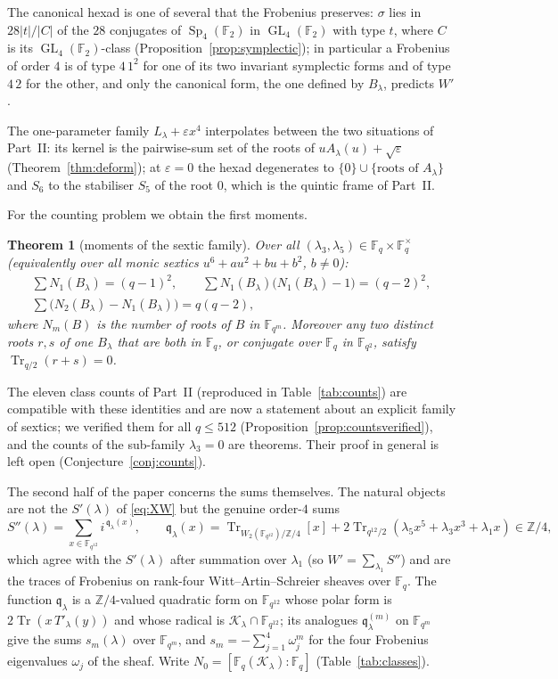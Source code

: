 ﻿\documentclass[12pt,a4paper]{amsart}
\newtheorem{theorem}{Theorem}[section]
\theoremstyle{definition}
\newcommand{\F}{\mathbb{F}}
\newcommand{\Z}{\mathbb{Z}}
\newcommand{\Tr}{\operatorname{Tr}}
\newcommand{\Sp}{\operatorname{Sp}}
\newcommand{\GL}{\operatorname{GL}}
\newcommand{\eps}{\varepsilon}
\newcommand{\Kk}{\mathcal{K}}
\newcommand{\qq}{\mathfrak{q}}
\newcommand{\Spp}{S''}
\begin{document}
The canonical hexad is one of several that the Frobenius preserves: $\sigma$ lies in $28|t|/|C|$ of the $28$ conjugates of $\Sp_4(\F_2)$ in $\GL_4(\F_2)$ with type $t$, where $C$ is its $\GL_4(\F_2)$-class (Proposition~\ref{prop:symplectic}); in particular a Frobenius of order $4$ is of type $4\,1^2$ for one of its two invariant symplectic forms and of type $4\,2$ for the other, and only the canonical form, the one defined by $B_\lambda$, predicts $W'$.

The one-parameter family $L_\lambda+\eps x^4$ interpolates between the two situations of Part~II: its kernel is the pairwise-sum set of the roots of $uA_\lambda(u)+\sqrt\eps$ (Theorem~\ref{thm:deform}); at $\eps=0$ the hexad degenerates to $\{0\}\cup\{\text{roots of }A_\lambda\}$ and $S_6$ to the stabiliser $S_5$ of the root $0$, which is the quintic frame of Part~II.

For the counting problem we obtain the first moments.

\begin{theorem}[moments of the sextic family]\label{thm:moments}
Over all $(\lambda_3,\lambda_5)\in\F_q\times\F_q^\times$ (equivalently over all monic sextics $u^6+au^2+bu+b^2$, $b\ne0$):
\begin{gather*}
\sum N_1(B_\lambda)=(q-1)^2,\qquad \sum N_1(B_\lambda)\bigl(N_1(B_\lambda)-1\bigr)=(q-2)^2,\\
\sum\bigl(N_2(B_\lambda)-N_1(B_\lambda)\bigr)=q(q-2),
\end{gather*}
where $N_m(B)$ is the number of roots of $B$ in $\F_{q^m}$. Moreover any two distinct roots $r,s$ of one $B_\lambda$ that are both in $\F_q$, or conjugate over $\F_q$ in $\F_{q^2}$, satisfy $\Tr_{q/2}(r+s)=0$.
\end{theorem}

The eleven class counts of Part~II (reproduced in Table~\ref{tab:counts}) are compatible with these identities and are now a statement about an explicit family of sextics; we verified them for all $q\le512$ (Proposition~\ref{prop:countsverified}), and the counts of the sub-family $\lambda_3=0$ are theorems. Their proof in general is left open (Conjecture~\ref{conj:counts}).

The second half of the paper concerns the sums themselves. The natural objects are not the $S'(\lambda)$ of \eqref{eq:XW} but the genuine order-$4$ sums
\begin{equation}\label{eq:Spp}
\Spp(\lambda)=\sum_{x\in\F_{q^{12}}}i^{\,\qq_\lambda(x)},\qquad \qq_\lambda(x)=\Tr_{W_2(\F_{q^{12}})/\Z/4}[x]+2\Tr_{q^{12}/2}(\lambda_5x^5+\lambda_3x^3+\lambda_1x)\in\Z/4,
\end{equation}
which agree with the $S'(\lambda)$ after summation over $\lambda_1$ (so $W'=\sum_{\lambda_1}\Spp$) and are the traces of Frobenius on rank-four Witt--Artin--Schreier sheaves over $\F_q$. The function $\qq_\lambda$ is a $\Z/4$-valued quadratic form on $\F_{q^{12}}$ whose polar form is $2\Tr(x\,T'_\lambda(y))$ and whose radical is $\Kk_\lambda\cap\F_{q^{12}}$; its analogues $\qq^{(m)}_\lambda$ on $\F_{q^m}$ give the sums $s_m(\lambda)$ over $\F_{q^m}$, and $s_m=-\sum_{j=1}^4\omega_j^m$ for the four Frobenius eigenvalues $\omega_j$ of the sheaf. Write $N_0=[\F_q(\Kk_\lambda):\F_q]$ (Table~\ref{tab:classes}).
\end{document}
